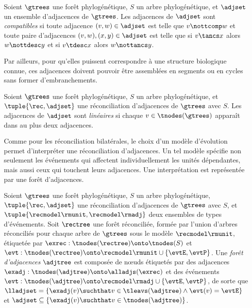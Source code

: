 \begin{definition}[Compatibilité]\label{definition:adjrec-adj-compat}
    Soient \(\gtrees\) une forêt phylogénétique, \(S\) un arbre phylogénétique, et \(\adjset\) un ensemble d’adjacences de \(\gtrees\).
    Les adjacences de \(\adjset\) sont \emph{compatibles} si
        toute adjacence \((v, w) \in \adjset\) est telle que \(v \nottcomp w\) et
        toute paire d’adjacences \((v, w), (x, y) \in \adjset\) est telle que
            si \(v \tancs x\) alors \(w \nottdesc y\) et
            si \(v \tdesc x\) alors \(w \nottancs y\).
\end{definition}

Par ailleurs, pour qu’elles puissent correspondre à une structure biologique connue, ces adjacences doivent pouvoir être assemblées en segments ou en cycles sans former d’embranchements.

\begin{definition}[Linéarité]\label{definition:adjrec-lin}
    Soient \(\gtrees\) une forêt phylogénétique, \(S\) un arbre phylogénétique, et \(\tuple{\rec, \adjset}\) une réconciliation d’adjacences de \(\gtrees\) avec \(S\).
    Les adjacences de \(\adjset\) sont \emph{linéaires} si chaque \(v \in \tnodes(\gtrees)\) apparaît dans au plus deux adjacences.
\end{definition}

Comme pour les réconciliation bilatérales, le choix d’un modèle d’évolution permet d’interpréter une réconciliation d’adjacences.
Un tel modèle spécifie non seulement les événements qui affectent individuellement les unités dépendantes, mais aussi ceux qui touchent leurs adjacences.
Une interprétation est représentée par une forêt d’adjacences.

\begin{definition}\label{definition:adjrectree}
    Soient \(\gtrees\) une forêt phylogénétique, \(S\) un arbre phylogénétique, \(\tuple{\rec, \adjset}\) une réconciliation d’adjacences de \(\gtrees\) avec \(S\), et \(\tuple{\recmodel\rmunit, \recmodel\rmadj}\) deux ensembles de types d’événements.
    Soit \(\rectree\) une forêt réconciliée, formée par l’union d’arbres réconciliés
        pour chaque arbre de \(\gtrees\) sous le modèle \(\recmodel\rmunit\),
        étiquetée par \(\exrec : \tnodes(\rectree) \onto \tnodes(S)\)
        et \(\evt : \tnodes(\rectree) \onto \recmodel\rmunit \cup \{\evtE, \evtP\}\).
    Une \emph{forêt d’adjacences} \(\adjtree\) est composée de nœuds
        étiquetés par des adjacences
        \(\exadj : \tnodes(\adjtree) \onto \alladjs(\exrec)\)
        et des événements
        \(\evt : \tnodes(\adjtree) \onto \recmodel\rmadj \cup \{\evtE, \evtP\}\),
        de sorte que \(\lladjset = \{\exadj(v) \suchthat v \in \tleavs(\adjtree) \land \evt(v) = \evtE\}\)
        et \(\adjset \subseteq \{\exadj(v) \suchthat v \in \tnodes(\adjtree)\}\).
\end{definition}

